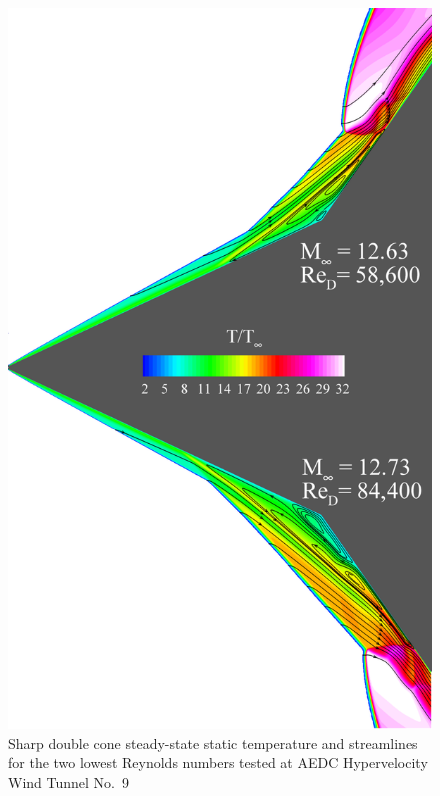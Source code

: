 \begin{figure}[hbtp]
  \begin{center}
    \includegraphics[height=.875\textheight]{figures/aedc_double_cone/2893_2894_composite_streamlines}
    \caption{Sharp double cone steady-state static temperature and streamlines for the two lowest Reynolds numbers tested at AEDC Hypervelocity Wind Tunnel No.~9\label{fig:double_cone_AEDC_steady_streamlines}}
  \end{center}
\end{figure}


